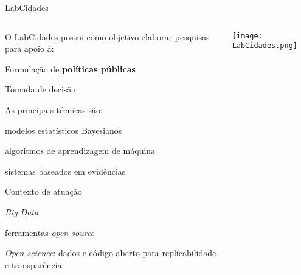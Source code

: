 \begin{frame}{LabCidades}
	\begin{columns}
	\begin{column}{0.8\textwidth}
		\begin{vfilleditems}
		\item O LabCidades possui como objetivo elaborar pesquisas para apoio à:
			\begin{vfilleditems}
			\item Formulação de \textbf{políticas públicas}
			\item Tomada de decisão
			\end{vfilleditems}
		\item As principais técnicas são: 
			\begin{vfilleditems}
			\item modelos estatísticos Bayesianos
			\item algoritmos de aprendizagem de máquina
			\item sistemas baseados em evidências
			\end{vfilleditems}
		\item Contexto de atuação
			\begin{vfilleditems}
			\item \textit{Big Data} 
			\item ferramentas \textit{open source}
			\item \textit{Open science}: dados e código aberto para replicabilidade e transparência
			\end{vfilleditems}
		\end{vfilleditems}
	\end{column}
	\begin{column}{0.2\textwidth}
		\centering
		\texttt{[image: LabCidades.png]}
	\end{column}
	\end{columns}
\end{frame}
